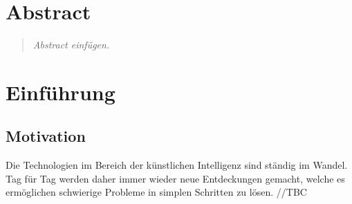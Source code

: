 \newcommand{\name}{Dennis Pidun}
\newcommand{\matr}{??????}
\newcommand{\email}{pidund@uni-hildesheim.de}
\newcommand{\studgang}{Angewandte Informatik (B.Sc.)}
\newcommand{\thema}{Safety Engineering in AGI}
\newcommand{\keywords}{}
\newcommand{\betreuer}{Dr. Pascal Reuß}

\newcommand{\semester}{Wintersemester 2019/2020}
\newcommand{\vtyp}{Seminar}
\newcommand{\veranstaltung}{IIS Seminar}
\newcommand{\prof}{Prof. Dr. Klaus-Dieter Althoff}
\newcommand{\lehrstuhl}{Institut für Informatik\\Bereich Intelligente Informationssysteme}



\usepackage[utf8]{inputenc}
\usepackage[T1]{fontenc}





\section*{Abstract}
\begin{abstract}\textsl{
Abstract einfügen.
}\end{abstract}
\newpage

\tableofcontents


\section{Einführung}
    \subsection{Motivation}
    Die Technologien im Bereich der künstlichen Intelligenz sind ständig im Wandel. Tag für Tag
    werden daher immer wieder neue Entdeckungen gemacht, welche es ermöglichen schwierige Probleme
    in simplen Schritten zu lösen. //TBC

